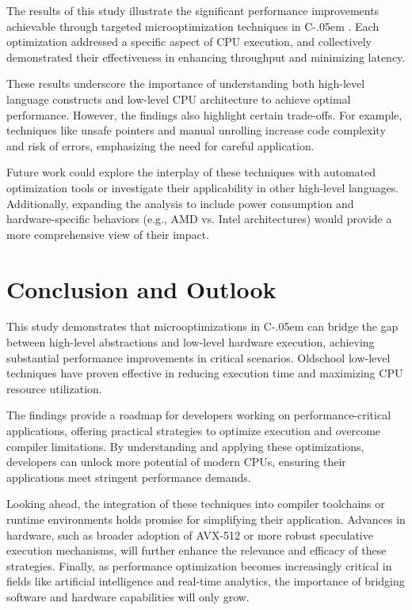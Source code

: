 \documentclass{article}
\newcommand{\Csharp}{%
  {\settoheight{\dimen0}{C}C\kern-.05em \resizebox{!}{\dimen0}{\raisebox{\depth}{\# }}}}
\begin{document}
The results of this study illustrate the significant performance improvements achievable through targeted microoptimization techniques in \Csharp. Each optimization addressed a specific aspect of CPU execution, and collectively demonstrated their effectiveness in enhancing throughput and minimizing latency. 

These results underscore the importance of understanding both high-level language constructs and low-level CPU architecture to achieve optimal performance. However, the findings also highlight certain trade-offs. For example, techniques like unsafe pointers and manual unrolling increase code complexity and risk of errors, emphasizing the need for careful application.

Future work could explore the interplay of these techniques with automated optimization tools or investigate their applicability in other high-level languages. Additionally, expanding the analysis to include power consumption and hardware-specific behaviors (e.g., AMD vs. Intel architectures) would provide a more comprehensive view of their impact.

\section{Conclusion and Outlook}

This study demonstrates that microoptimizations in \Csharp can bridge the gap between high-level abstractions and low-level hardware execution, achieving substantial performance improvements in critical scenarios. Oldschool low-level techniques have proven effective in reducing execution time and maximizing CPU resource utilization.

The findings provide a roadmap for developers working on performance-critical applications, offering practical strategies to optimize execution and overcome compiler limitations. By understanding and applying these optimizations, developers can unlock more potential of modern CPUs, ensuring their applications meet stringent performance demands.

Looking ahead, the integration of these techniques into compiler toolchains or runtime environments holds promise for simplifying their application. Advances in hardware, such as broader adoption of AVX-512 or more robust speculative execution mechanisms, will further enhance the relevance and efficacy of these strategies. Finally, as performance optimization becomes increasingly critical in fields like artificial intelligence and real-time analytics, the importance of bridging software and hardware capabilities will only grow.
\end{document}
